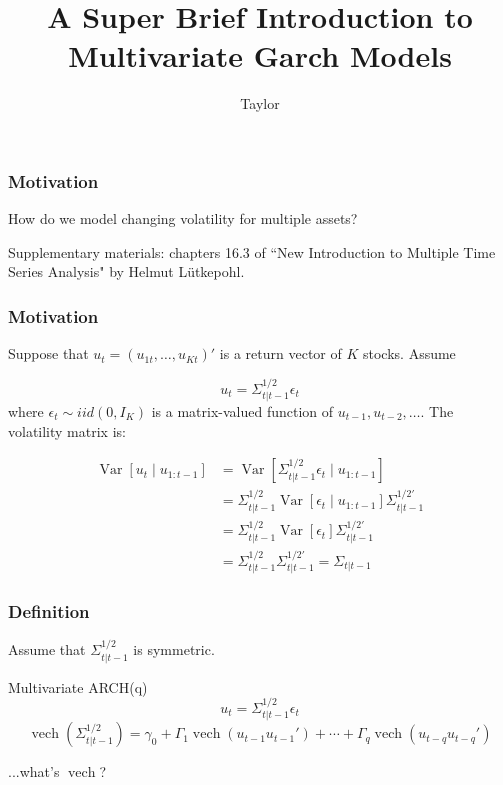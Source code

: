 \documentclass{beamer}
\title["Miscellany"]{A Super Brief Introduction to Multivariate Garch Models}
\author{Taylor}
\institute[UVA] 
{
University of Virginia \\
\medskip
\textit{} 
}
\date{}
\begin{document}

\begin{frame}
\titlepage 
\end{frame}

\begin{frame}
\frametitle{Motivation}

How do we model changing volatility for multiple assets?
\newline

Supplementary materials: chapters 16.3 of ``New Introduction to Multiple Time Series Analysis" by Helmut L\"{u}tkepohl.
\end{frame}


\begin{frame}
\frametitle{Motivation}

Suppose that $u_t = (u_{1t},\ldots,u_{Kt})'$ is a return vector of $K$ stocks. Assume
\newline

\[
u_t = \Sigma_{t|t-1}^{1/2}\epsilon_t
\]
where $\epsilon_t \sim iid(0,I_K)$ is a matrix-valued function of $u_{t-1},u_{t-2},\ldots$. The volatility matrix is:
\newline

\begin{align*}
\operatorname{Var}\left[ u_t \mid u_{1:t-1} \right] &= \operatorname{Var}\left[\Sigma_{t|t-1}^{1/2}\epsilon_t \mid u_{1:t-1} \right] \\
&= \Sigma_{t|t-1}^{1/2}  \operatorname{Var}\left[ \epsilon_t \mid u_{1:t-1} \right] \Sigma_{t|t-1}^{1/2'}\\
&=  \Sigma_{t|t-1}^{1/2}  \operatorname{Var}\left[\epsilon_t  \right] \Sigma_{t|t-1}^{1/2'} \\
&= \Sigma_{t|t-1}^{1/2}  \Sigma_{t|t-1}^{1/2'}  = \Sigma_{t | t-1}
\end{align*}

\end{frame}


\begin{frame}
\frametitle{Definition}

Assume that $\Sigma_{t|t-1}^{1/2}$ is symmetric. 
\begin{block}{ Multivariate ARCH(q)}
\[
u_t = \Sigma_{t|t-1}^{1/2}\epsilon_t
\]
\[
\operatorname{vech}\left( \Sigma_{t|t-1}^{1/2} \right)= \gamma_0 + \Gamma_1 \operatorname{vech}(u_{t-1} u_{t-1}') + \cdots + \Gamma_q\operatorname{vech}(u_{t-q} u_{t-q}')
\]
\end{block}

...what's $\operatorname{vech}$?
\end{frame}
\end{document}
